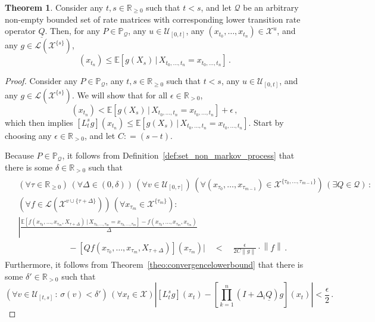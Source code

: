 \documentclass[10pt]{paper}
\theoremstyle{definition}
\newtheorem{theorem}{Theorem}
\newcommand{\reals}{\mathbb{R}}
\newcommand{\realspos}{\reals_{>0}}
\newcommand{\realsnonneg}{\reals_{\geq 0}}
\newcommand{\states}{\mathcal{X}}
\newcommand{\processes}{\mathbb{P}}
\newcommand{\gambles}{\mathcal{L}}
\newcommand{\rateset}{\mathcal{Q}}
\newcommand{\lrate}{\underline{Q}}
\newcommand{\norm}[1]{\left\lVert #1 \right\rVert}
\newcommand{\abs}[1]{\left\vert #1 \right\vert}
\newcommand{\coloneqq}{:\!=}
\begin{document}
\begin{theorem}\label{theorem:nonmarkov_single_var_lower_bounded}
Consider any $t,s\in\realsnonneg$ such that $t<s$, and let $\rateset$ be an arbitrary non-empty bounded set of rate matrices with corresponding lower transition rate operator $\lrate$. Then, for any $P\in\processes_\rateset$, any $u\in\mathcal{U}_{[0,t]}$, any $(x_{t_0},\ldots,x_{t_n})\in\states^u$, and any $g\in\gambles(\states^{\{s\}})$,
\begin{equation*}
[L_t^s g](x_{t_n}) \leq \mathbb{E}[g(X_s)\,\vert\,X_{t_0,\ldots,t_n}=x_{t_0,\ldots,t_n}]\,.
\end{equation*}
\end{theorem}
\begin{proof}
Consider any $P\in\processes_\rateset$, any $t,s\in\realsnonneg$ such that $t<s$, any $u\in\mathcal{U}_{[0,t]}$, and any $g\in\gambles(\states^{\{s\}})$. We will show that for all $\epsilon\in\realspos$,
\begin{equation*}
[L_t^s g](x_{t_n}) < \mathbb{E}[g(X_s)\,\vert\,X_{t_0,\ldots,t_n}=x_{t_0,\ldots,t_n}] + \epsilon\,,
\end{equation*}
which then implies $[L_t^s g](x_{t_n}) \leq \mathbb{E}[g(X_s)\,\vert\,X_{t_0,\ldots,t_n}=x_{t_0,\ldots,t_n}]$. Start by choosing any $\epsilon\in\realspos$, and let $C\coloneqq (s-t)$.

Because $P\in\processes_\rateset$, it follows from Definition~\ref{def:set_non_markov_process} that there is some $\delta\in\realspos$ such that
\begin{align}\label{eq:nonmarkov_bound_proof_deriv_bounded}
\begin{split}
 &(\forall \tau\in\realsnonneg)\,(\forall\Delta\in(0,\delta))\,(\forall v\in\mathcal{U}_{[0,\tau]})\,(\forall(x_{\tau_0},\ldots,x_{\tau_{m-1}})\in\states^{\{\tau_0,\ldots,\tau_{m-1}\}})\,(\exists Q\in\rateset)\,: \\
 &(\forall f\in\gambles(\states^{v\cup\{\tau+\Delta\}}))\,(\forall x_{\tau_m}\in\states^{\{\tau_m\}}): \\
 &\left\lvert \frac{\mathbb{E}[f(x_{\tau_0},\ldots,x_{\tau_m},X_{\tau+\Delta})\,\vert\,X_{\tau_0,\ldots,\tau_m}=x_{\tau_0,\ldots,\tau_m}] 
 - f(x_{\tau_0},\ldots,x_{\tau_m},x_{\tau_m})}{\Delta} \right. \\
 &\quad\quad\quad\quad\quad\quad - \left[Q f(x_{\tau_0},\ldots,x_{\tau_{m}},X_{\tau+\Delta})\right](x_{\tau_m})\biggr\rvert \quad < \quad\frac{\epsilon}{2C\norm{g}}\cdot\norm{f}\,.
\end{split}
\end{align}
Furthermore, it follows from Theorem~\ref{theo:convergencelowerbound} that there is some $\delta'\in\realspos$ such that
\begin{equation}\label{eq:nonmarkov_bound_proof_lbound_approx}
(\forall v\in\mathcal{U}_{[t,s]}\,:\,\sigma(v)<\delta')\,(\forall x_t\in\states)\abs{\left[L_t^s g\right](x_t) - \left[\prod_{k=1}^n(I+\Delta_i\lrate)g\right](x_t)} < \frac{\epsilon}{2}\,.
\end{equation}


\end{proof}
\end{document}
